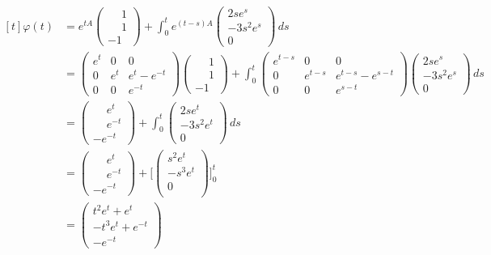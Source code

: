 \documentclass[11pt]{report}
\begin{document}
\[
\begin{aligned}[t]
\varphi(t)&=e^{tA}\begin{pmatrix}
    \phantom{-}1 \\
    \phantom{-}1 \\
    -1
\end{pmatrix}+\int_0^te^{(t-s)A}\begin{pmatrix}
    2se^s \\
    -3s^2e^s \\
    0
\end{pmatrix} \, ds \\
&= \begin{pmatrix}
    e^t & 0 & 0 \\
    0 & e^t & e^t-e^{-t} \\
    0  & 0 & e^{-t}
\end{pmatrix}\begin{pmatrix}
    \phantom{-}1 \\
    \phantom{-}1 \\
    -1
\end{pmatrix}+\int_0^t\begin{pmatrix}
    e^{t-s} & 0 & 0 \\
    0 & e^{t-s} & e^{t-s} - e^{s-t} \\
    0 & 0 & e^{s-t}
\end{pmatrix}\begin{pmatrix}
    2se^s \\
    -3s^2e^s \\
    0
\end{pmatrix} \, ds \\
&=\begin{pmatrix}
    \phantom{-}e^t \\
    \phantom{-}e^{-t} \\
    -e^{-t}
\end{pmatrix}+\int_0^t\begin{pmatrix}
    2se^{t} \\
    -3s^2e^t \\
    0
\end{pmatrix} \, ds \\
&=\begin{pmatrix}
    \phantom{-}e^t \\
    \phantom{-}e^{-t} \\
    -e^{-t}
\end{pmatrix}+\Biggl[\begin{pmatrix}
    s^2e^t\\
    -s^3e^t\\
    0 \\
\end{pmatrix}\Biggr]_0^t \\
&=\begin{pmatrix}
    t^2e^t+e^t\\
    -t^3e^t+e^{-t} \\
    -e^{-t}
\end{pmatrix}
\end{aligned}
\]
\end{document}

